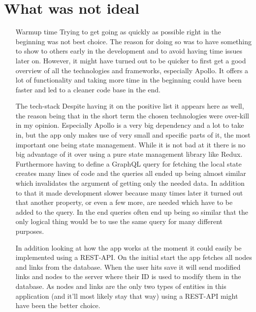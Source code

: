 \section{What was not ideal}
\begin{itemize}
\item[Warmup time] Trying to get going as quickly as possible right in the beginning was not best choice. The reason for doing so was to have something to show to others early in the development and to avoid having time issues later on. However, it might have turned out to be quicker to first get a good overview of all the technologies and frameworks, especially Apollo. It offers a lot of functionality and taking more time in the beginning could have been faster and led to a cleaner code base in the end.

\item[The tech-stack] Despite having it on the positive list it appears here as well, the reason being that in the short term the chosen technologies were over-kill in my opinion. Especially Apollo is a very big dependency and a lot to take in, but the app only makes use of very small and specific parts of it, the most important one being state management. While it is not bad at it there is no big advantage of it over using a pure state management library like Redux. Furthermore having to define a GraphQL query for fetching the local state creates many lines of code and the queries all ended up being almost similar which invalidates the argument of getting only the needed data. In addition to that it made development slower because many times later it turned out that another property, or even a few more, are needed which have to be added to the query. In the end queries often end up being so similar that the only logical thing would be to use the same query for many different purposes.

In addition looking at how the app works at the moment it could easily be implemented using a REST-API. On the initial start the app fetches all nodes and links from the database. When the user hits save it will send modified links and nodes to the server where their ID is used to modify them in the database. As nodes and links are the only two types of entities in this application (and it'll most likely stay that way) using a REST-API might have been the better choice.
\end{itemize}


